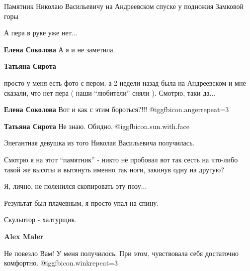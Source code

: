  
 
 
 
 


Памятник Николаю Васильевичу на Андреевском спуске у подножия Замковой горы

А пера в руке уже нет...

\textbf{Елена Соколова} А я и не заметила.

\textbf{Татьяна Сирота} 

просто у меня есть фото с пером, а 2 недели назад была на Андреевском и мне
сказали, что нет пера ( наши \enquote{любители} сняли ). Смотрю, таки да...


\textbf{Елена Соколова} Вот и как с этим бороться?!!! @igg{fbicon.anger}{repeat=3} 

\textbf{Татьяна Сирота} Не знаю. Обидно. @igg{fbicon.sun.with.face} 

Элегантная девушка из того Николая Васильевича получилась.


Смотрю я на этот \enquote{памятник} - никто не пробовал вот так сесть на что-либо такой
же высоты и вытянуть именно так ноги, закинув одну на другую?

Я, лично, не поленился скопировать эту позу...

Результат был плачевным, я просто упал на спину.

Скульптор - халтурщик.

\textbf{Alex Maler} 

Не повезло Вам! У меня получилось. При этом, чувствовала себя достаточно
комфортно. @igg{fbicon.wink}{repeat=3} 
